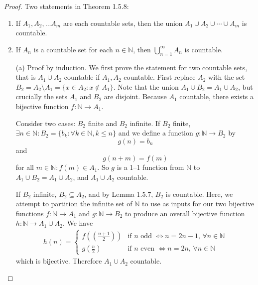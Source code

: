\documentclass[11pt,twoside, reqno]{amsart}
\theoremstyle{remark}
\def\N{\mathbb N}
\renewcommand{\iff}{\Leftrightarrow}
\begin{document}
\begin{proof} Two statements in Theorem 1.5.8:
\begin{enumerate}
    \item If $A_1, A_2, \ldots A_m$ are each countable sets, then the union $A_1 \cup A_2 \cup \cdots \cup A_m$ is countable.
    \item If $A_n$ is a countable set for each $n \in \N$, then $\bigcup^\infty_{n=1} A_n$ is countable.
\end{enumerate}
\begin{enumerate}
    \item[(a)] Proof by induction. We first prove the statement for two countable sets, that is $A_1 \cup A_2$ countable if $A_1, A_2$ countable. First replace $A_2$ with the set $B_2 = A_2 \setminus A_1 = \{x \in A_2 : x \not \in A_1\}$. Note that the union $A_1 \cup B_2 = A_1 \cup A_2$, but crucially the sets $A_1$ and $B_2$ are disjoint. Because $A_1$ countable, there exists a bijective function $f:\N \to A_1$. 
    
    Consider two cases: $B_2$ finite and $B_2$ infinite. If $B_2$ finite, $\exists n \in \N : B_2 = \{b_k : \forall k \in \N, k \leq n \}$ and we define a function $g:\N \to B_2$ by
    $$
    g(n) = b_n
    $$
    and
    $$
    g(n+m) = f(m)
    $$
    for all $m \in \N : f(m) \in A_1$. So $g$ is a 1--1 function from $\N$ to $A_1 \cup B_2 = A_1 \cup A_2$, and $A_1 \cup A_2$ countable.
    
    \newtheorem{Lm}[Lemma 1.5.7]{ If $A \subseteq B$ and $B$ is countable, then $A$ is either countable or finite.}
    
    If $B_2$ infinite, $B_2 \subseteq A_2$, and by Lemma 1.5.7, $B_2$ is countable. Here, we attempt to  partition the infinite set of $\N$ to use as inputs for our two bijective functions $f:\N \to A_1$ and $g:\N \to B_2$ to produce an overall bijective function $h:\N \to A_1\cup A_2$. We have
    \begin{align*}
        h(n) = 
    \begin{cases}
        f((\frac{n+1}{2})) &\text{if $n$ odd $\iff n = 2n-1$, $\forall n \in \N$}\\
        g(\frac{n}{2}) &\text{if $n$ even $\iff n = 2n$, $\forall n \in \N$}
    \end{cases}
    \end{align*}
    which is bijective. Therefore $A_1 \cup A_2$ countable.
    

\end{enumerate}
\end{proof}
\end{document}
